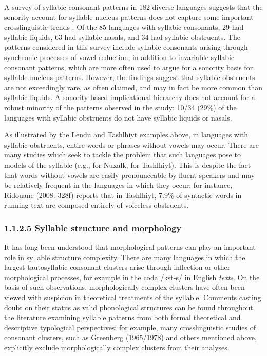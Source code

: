   A survey of syllabic consonant patterns in 182 diverse languages suggests that the sonority account for syllable nucleus patterns does not capture some important crosslinguistic trends \citep{Bell1978a}. Of the 85 languages with syllabic consonants, 29 had syllabic liquids, 63 had syllabic nasals, and 34 had syllabic obstruents. The patterns considered in this survey include syllabic consonants arising through synchronic processes of vowel reduction, in addition to invariable syllabic consonant patterns, which are more often used to argue for a sonority basis for syllable nucleus patterns. However, the findings suggest that syllabic obstruents are not exceedingly rare, as often claimed, and may in fact be more common than syllabic liquids. A sonority-based implicational hierarchy does not account for a robust minority of the patterns observed in the study: 10/34 (29\%) of the languages with syllabic obstruents do not have syllabic liquids or nasals.



  As illustrated by the Lendu and Tashlhiyt examples above, in languages with syllabic obstruents, entire words or phrases without vowels may occur. There are many studies which seek to tackle the problem that such languages pose to models of the syllable (e.g., \citealt{Bagemihl1991} for Nuxalk, \citealt{Coleman2001} for Tashlhiyt). This is despite the fact that words without vowels are easily pronounceable by fluent speakers and may be relatively frequent in the languages in which they occur: for instance, Ridouane (2008: 328f) reports that in Tashlhiyt, 7.9\% of syntactic words in running text are composed entirely of voiceless obstruents. 


\subsubsection{\textbf{1.1.2.5} \textbf{Syllable} \textbf{structure} \textbf{and} \textbf{morphology}}

  It has long been understood that morphological patterns can play an important role in syllable structure complexity. There are many languages in which the largest tautosyllabic consonant clusters arise through inflection or other morphological processes, for example in the coda /kst-s/ in English \textit{texts}. On the basis of such observations, morphologically complex clusters have often been viewed with suspicion in theoretical treatments of the syllable. Comments casting doubt on their status as valid phonological structures can be found throughout the literature examining syllable patterns from both formal theoretical and descriptive typological perspectives: for example, many crosslinguistic studies of consonant clusters, such as Greenberg (1965/1978) and others mentioned above, explicitly exclude morphologically complex clusters from their analyses. 



